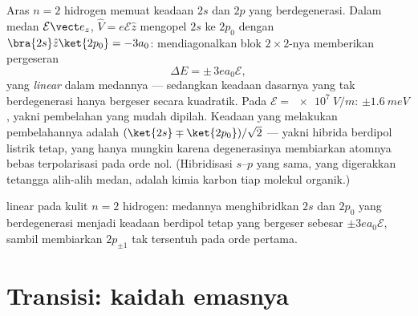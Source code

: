 \begin{example}\label{ex:b3:perturbation-theory:stark}
Aras $n = 2$ hidrogen memuat keadaan $2s$ dan $2p$ yang berdegenerasi.
Dalam medan $\mathcal E\vect e_z$, $\hat V = e\mathcal E\hat z$
mengopel $2s$ ke $2p_0$ dengan $\bra{2s}\hat z\ket{2p_0} = -3a_0$:
mendiagonalkan blok $2\times2$-nya memberikan pergeseran
\[
\Delta E = \pm\,3e a_0\mathcal E ,
\]
yang \emph{linear} dalam medannya --- sedangkan keadaan dasarnya yang
tak berdegenerasi hanya bergeser secara kuadratik. Pada
$\mathcal E = \qty{e7}{V/m}$: $\pm
\qty{1.6}{meV}$, yakni pembelahan yang mudah dipilah. Keadaan yang
melakukan pembelahannya adalah $(\ket{2s} \mp \ket{2p_0})/\sqrt2$ ---
yakni hibrida berdipol listrik tetap, yang hanya mungkin karena
degenerasinya membiarkan atomnya bebas terpolarisasi pada orde nol.
(Hibridisasi $s$--$p$ yang sama, yang digerakkan tetangga alih-alih
medan, adalah kimia karbon tiap molekul organik.)
\end{example}

\begin{omfigure}

{\small {} linear pada kulit $n = 2$ hidrogen: medannya
menghibridkan $2s$ dan $2p_0$ yang berdegenerasi menjadi keadaan
berdipol tetap yang bergeser sebesar $\pm3ea_0\mathcal E$, sambil
membiarkan $2p_{\pm1}$ tak tersentuh pada orde pertama.}
\end{omfigure}

\section{Transisi: kaidah emasnya}


